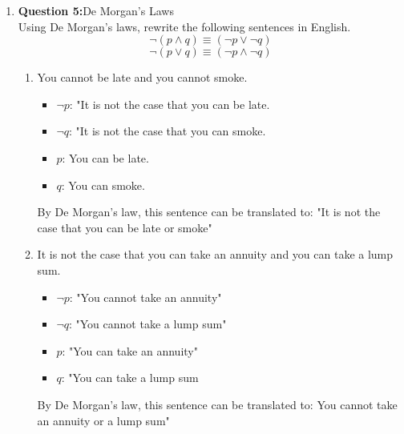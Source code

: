 \documentclass[11pt]{article}
\begin{document}
\begin{enumerate}
\begin{enumerate}[label=(\alph*)]
\begin{tabular}{|c|c|c|c|c|c|c|c|}
\hline
\end{tabular}
\end{enumerate}
\item
\textbf{Question 5:}De Morgan's Laws\\
Using De Morgan's laws, rewrite the following sentences in English.\\
\begin{equation}
 \lnot(p \wedge q) \equiv (\lnot p \vee \lnot q)
\end{equation}
\begin{equation}
\lnot(p \vee q) \equiv (\lnot p \wedge \lnot q) 
\end{equation}
\begin{enumerate}[label=(\alph*)]
\item
You cannot be late and you cannot smoke. \\
\begin{itemize}

\item 
$\lnot p$: "It is not the case that you can be late.
\item 
$\lnot q$: "It is not the case that you can smoke.
\item 
$p$: You can be late.
\item 
$q$: You can smoke.
\end{itemize}
By De Morgan's law, this sentence can be translated to: "It is not the case that you can be late or smoke" \\
\item 
It is not the case that you can take an annuity and you can take a lump sum. \\
\begin{itemize}
\item
$\lnot p$: "You cannot take an annuity"
\item 
$\lnot q$: "You cannot take a lump sum"
\item 
$p$: "You can take an annuity"
\item 
$q$: "You can take a lump sum
\end{itemize}
By De Morgan's law, this sentence can be translated to: You cannot take an annuity or a lump sum"
\end{enumerate}


\end{enumerate}
\end{document}
